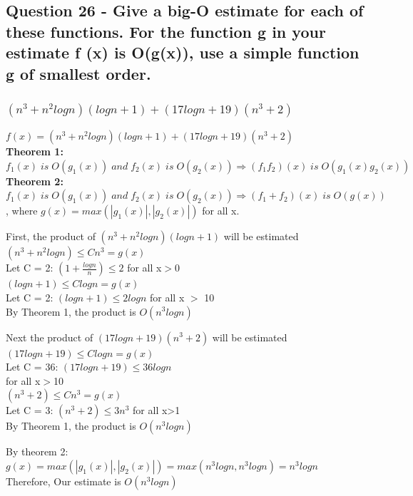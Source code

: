 \documentclass{article}
\begin{document}
\subsection[26]{Question 26 - Give a big-O estimate for each of these functions. For the function g in your estimate f (x) is O(g(x)), use a simple function g of smallest order.}
\subsubsection[a]{$(n^3 +n^2 logn)(logn+1) +(17 logn+19)(n^3 +2)$}
$f(x) = (n^3 +n^2 logn)(logn+1) +(17 logn+19)(n^3 +2)$\\
\textbf{Theorem 1:} $f_1(x) \; is \; O(g_1(x))\; and \; f_2(x)\; is \; O(g_2(x)) \Longrightarrow (f_1f_2)(x) \; is\; O(g_1(x)g_2(x))$\\
\textbf{Theorem 2:} $f_1(x) \; is \; O(g_1(x))\; and \; f_2(x)\; is \; O(g_2(x)) \Longrightarrow (f_1+f_2)(x) \; is\; O(g(x))$, where $g(x) = max(|g_1(x)|,|g_2(x)|)$ for all x.\\
\vspace{0.5cm}

\noindent First, the product of $(n^3 +n^2 logn)(logn+1)$ will be estimated\\
$(n^3 +n^2 logn) \leq Cn^3 = g(x)$\\
Let C = 2: $(1 + \frac{logn}{n}) \leq 2$ for all x$>$0\\
$(logn +1) \leq Clogn =g(x)$\\
Let C = 2: $(logn +1) \leq 2logn$ for all x $>$ 10\\
By Theorem 1, the product is $O(n^3logn)$\\\vspace{0.5cm}

\noindent Next the product of $(17 logn+19)(n^3 +2)$ will be estimated\\
$(17 logn+19) \leq Clogn = g(x)$\\
Let C = 36: $(17 logn+19) \leq 36logn$\\ for all x$>$10\\
$(n^3 +2) \leq Cn^3 = g(x)$\\
Let C = 3: $(n^3 +2) \leq 3n^3$ for all x>1\\
By Theorem 1, the product is $O(n^3logn)$\\\vspace{0.5cm}

\noindent By theorem 2: $g(x) = max(|g_1(x)|,|g_2(x)|) = max(n^3logn, n^3logn) = n^3logn$\\
Therefore, Our estimate is $O(n^3logn)$
\end{document}

